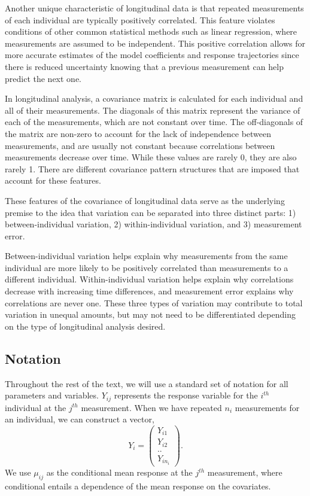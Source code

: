 \documentclass[12pt, twoside]{amherstthesis}
\begin{document}
Another unique characteristic of longitudinal data is that repeated measurements of each individual are typically positively correlated. This feature violates conditions of other common statistical methods such as linear regression, where measurements are assumed to be independent. This positive correlation allows for more accurate estimates of the model coefficients and response trajectories since there is reduced uncertainty knowing that a previous measurement can help predict the next one.

In longitudinal analysis, a covariance matrix is calculated for each individual and all of their measurements. The diagonals of this matrix represent the variance of each of the measurements, which are not constant over time. The off-diagonals of the matrix are non-zero to account for the lack of independence between measurements, and are usually not constant because correlations between measurements decrease over time. While these values are rarely 0, they are also rarely 1. There are different covariance pattern structures that are imposed that account for these features.

These features of the covariance of longitudinal data serve as the underlying premise to the idea that variation can be separated into three distinct parts: 1) between-individual variation, 2) within-individual variation, and 3) measurement error.

Between-individual variation helps explain why measurements from the same individual are more likely to be positively correlated than measurements to a different individual. Within-individual variation helps explain why correlations decrease with increasing time differences, and measurement error explains why correlations are never one. These three types of variation may contribute to total variation in unequal amounts, but may not need to be differentiated depending on the type of longitudinal analysis desired.

\hypertarget{notation}{%
\subsection{Notation}\label{notation}}

Throughout the rest of the text, we will use a standard set of notation for all parameters and variables. \(Y_{ij}\) represents the response variable for the \(i^{th}\) individual at the \(j^{th}\) measurement. When we have repeated \(n_i\) measurements for an individual, we can construct a vector, \[Y_i = \begin{pmatrix} Y_{i1}\\ Y_{i2} \\ .. \\  Y_{in_i}  \end{pmatrix}.\] We use \(\mu_{ij}\) as the conditional mean response at the \(j^{th}\) measurement, where conditional entails a dependence of the mean response on the covariates.
\end{document}
